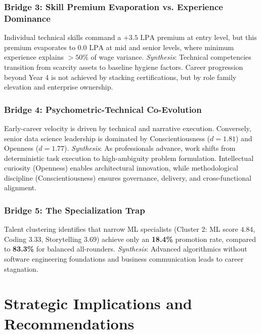 \documentclass[conference]{IEEEtran}
\begin{document}
\subsubsection{Bridge 3: Skill Premium Evaporation vs. Experience Dominance}
Individual technical skills command a $+3.5\text{ LPA}$ premium at entry level, but this premium evaporates to $0.0\text{ LPA}$ at mid and senior levels, where minimum experience explains $>50\%$ of wage variance.
\textit{Synthesis}: Technical competencies transition from scarcity assets to baseline hygiene factors. Career progression beyond Year 4 is not achieved by stacking certifications, but by role family elevation and enterprise ownership.

\subsubsection{Bridge 4: Psychometric-Technical Co-Evolution}
Early-career velocity is driven by technical and narrative execution. Conversely, senior data science leadership is dominated by Conscientiousness ($d=1.81$) and Openness ($d=1.77$).
\textit{Synthesis}: As professionals advance, work shifts from deterministic task execution to high-ambiguity problem formulation. Intellectual curiosity (Openness) enables architectural innovation, while methodological discipline (Conscientiousness) ensures governance, delivery, and cross-functional alignment.

\subsubsection{Bridge 5: The Specialization Trap}
Talent clustering identifies that narrow ML specialists (Cluster 2: ML score $4.84$, Coding $3.33$, Storytelling $3.69$) achieve only an \textbf{18.4\%} promotion rate, compared to \textbf{83.3\%} for balanced all-rounders.
\textit{Synthesis}: Advanced algorithmics without software engineering foundations and business communication leads to career stagnation.

\section{Strategic Implications and Recommendations}
\label{sec:implications}
\end{document}
